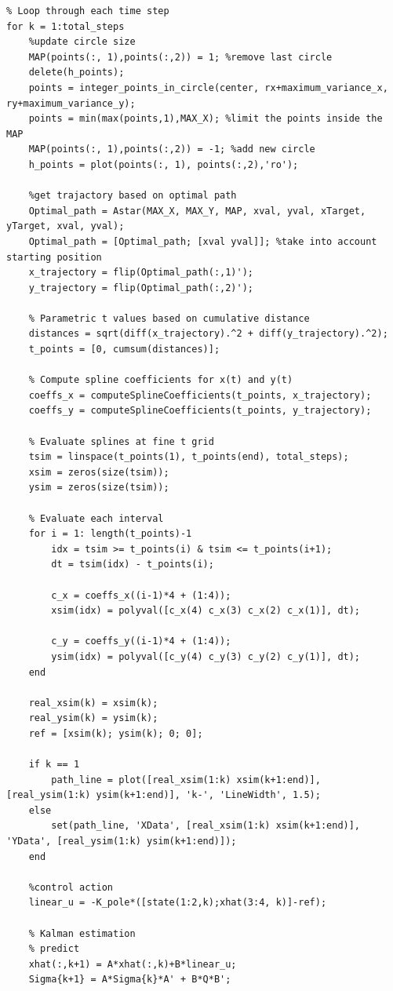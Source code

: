 \documentclass[12pt]{article}
\begin{document}
\begin{lstlisting}
% Loop through each time step
for k = 1:total_steps
    %update circle size
    MAP(points(:, 1),points(:,2)) = 1; %remove last circle
    delete(h_points);
    points = integer_points_in_circle(center, rx+maximum_variance_x, ry+maximum_variance_y);
    points = min(max(points,1),MAX_X); %limit the points inside the MAP
    MAP(points(:, 1),points(:,2)) = -1; %add new circle
    h_points = plot(points(:, 1), points(:,2),'ro');

    %get trajactory based on optimal path
    Optimal_path = Astar(MAX_X, MAX_Y, MAP, xval, yval, xTarget, yTarget, xval, yval);
    Optimal_path = [Optimal_path; [xval yval]]; %take into account starting position
    x_trajectory = flip(Optimal_path(:,1)');
    y_trajectory = flip(Optimal_path(:,2)');
    
    % Parametric t values based on cumulative distance
    distances = sqrt(diff(x_trajectory).^2 + diff(y_trajectory).^2);
    t_points = [0, cumsum(distances)];
    
    % Compute spline coefficients for x(t) and y(t)
    coeffs_x = computeSplineCoefficients(t_points, x_trajectory);
    coeffs_y = computeSplineCoefficients(t_points, y_trajectory);
    
    % Evaluate splines at fine t grid
    tsim = linspace(t_points(1), t_points(end), total_steps);
    xsim = zeros(size(tsim));
    ysim = zeros(size(tsim));
    
    % Evaluate each interval
    for i = 1: length(t_points)-1
        idx = tsim >= t_points(i) & tsim <= t_points(i+1);
        dt = tsim(idx) - t_points(i);
    
        c_x = coeffs_x((i-1)*4 + (1:4));
        xsim(idx) = polyval([c_x(4) c_x(3) c_x(2) c_x(1)], dt);
    
        c_y = coeffs_y((i-1)*4 + (1:4));
        ysim(idx) = polyval([c_y(4) c_y(3) c_y(2) c_y(1)], dt);
    end

    real_xsim(k) = xsim(k);
    real_ysim(k) = ysim(k);
    ref = [xsim(k); ysim(k); 0; 0];
    
    if k == 1
        path_line = plot([real_xsim(1:k) xsim(k+1:end)], [real_ysim(1:k) ysim(k+1:end)], 'k-', 'LineWidth', 1.5);
    else
        set(path_line, 'XData', [real_xsim(1:k) xsim(k+1:end)], 'YData', [real_ysim(1:k) ysim(k+1:end)]);
    end 

    %control action 
    linear_u = -K_pole*([state(1:2,k);xhat(3:4, k)]-ref);

    % Kalman estimation
    % predict
    xhat(:,k+1) = A*xhat(:,k)+B*linear_u;
    Sigma{k+1} = A*Sigma{k}*A' + B*Q*B';


\end{lstlisting}
\end{document}
